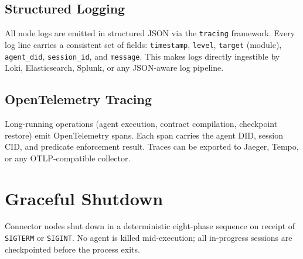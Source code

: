 \subsection{Structured Logging}

All node logs are emitted in structured JSON via the \texttt{tracing} framework.
Every log line carries a consistent set of fields: \texttt{timestamp},
\texttt{level}, \texttt{target} (module), \texttt{agent\_did},
\texttt{session\_id}, and \texttt{message}. This makes logs directly
ingestible by Loki, Elasticsearch, Splunk, or any JSON-aware log pipeline.

\subsection{OpenTelemetry Tracing}

Long-running operations (agent execution, contract compilation, checkpoint
restore) emit OpenTelemetry spans. Each span carries the agent DID, session
CID, and predicate enforcement result. Traces can be exported to Jaeger,
Tempo, or any OTLP-compatible collector.

\section{Graceful Shutdown}

Connector nodes shut down in a deterministic eight-phase sequence on receipt
of \texttt{SIGTERM} or \texttt{SIGINT}. No agent is killed mid-execution;
all in-progress sessions are checkpointed before the process exits.

